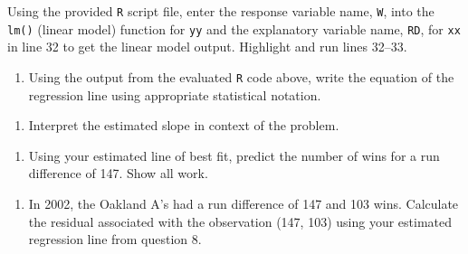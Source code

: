 \documentclass[
]{report}
\newenvironment{Shaded}{\begin{snugshade}}{\end{snugshade}}
\newcommand{\AttributeTok}[1]{\textcolor[rgb]{0.77,0.63,0.00}{#1}}
\newcommand{\CommentTok}[1]{\textcolor[rgb]{0.56,0.35,0.01}{\textit{#1}}}
\newcommand{\DecValTok}[1]{\textcolor[rgb]{0.00,0.00,0.81}{#1}}
\newcommand{\FunctionTok}[1]{\textcolor[rgb]{0.00,0.00,0.00}{#1}}
\newcommand{\NormalTok}[1]{#1}
\newcommand{\OtherTok}[1]{\textcolor[rgb]{0.56,0.35,0.01}{#1}}
\newcommand{\SpecialCharTok}[1]{\textcolor[rgb]{0.00,0.00,0.00}{#1}}
\providecommand{\tightlist}{%
  \setlength{\itemsep}{0pt}\setlength{\parskip}{0pt}}
\begin{document}
Using the provided \texttt{R} script file, enter the response variable name, \texttt{W}, into the \texttt{lm()} (linear model) function for \texttt{yy} and the explanatory variable name, \texttt{RD}, for \texttt{xx} in line 32 to get the linear model output. Highlight and run lines 32--33.

\begin{Shaded}
\end{Shaded}

\begin{enumerate}
\def\labelenumi{\arabic{enumi}.}
\setcounter{enumi}{7}
\tightlist
\item
  Using the output from the evaluated \texttt{R} code above, write the equation of the regression line using appropriate statistical notation.
\end{enumerate}

\vspace{1in}

\begin{enumerate}
\def\labelenumi{\arabic{enumi}.}
\setcounter{enumi}{8}
\tightlist
\item
  Interpret the estimated slope in context of the problem.
\end{enumerate}

\vspace{1in}

\begin{enumerate}
\def\labelenumi{\arabic{enumi}.}
\setcounter{enumi}{9}
\tightlist
\item
  Using your estimated line of best fit, predict the number of wins for a run difference of 147. Show all work.
\end{enumerate}

\vspace{1in}

\begin{enumerate}
\def\labelenumi{\arabic{enumi}.}
\setcounter{enumi}{10}
\tightlist
\item
  In 2002, the Oakland A's had a run difference of 147 and 103 wins. Calculate the residual associated with the observation (147, 103) using your estimated regression line from question 8.
\end{enumerate}
\end{document}
